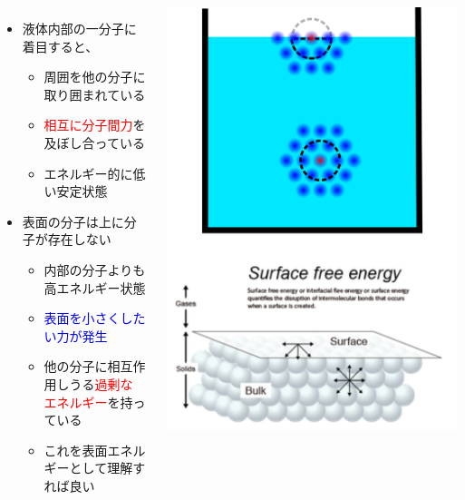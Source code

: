 \documentclass[unicode,12pt]{beamer}%
\begin{document}
\begin{frame}
	\begin{columns}[c, onlytextwidth]
			\begin{itemize}
				\item 液体内部の一分子に着目すると、
				\begin{itemize}
					\item 周囲を他の分子に取り囲まれている
					\item \textcolor{red}{相互に分子間力}を及ぼし合っている
					\item エネルギー的に低い安定状態
				\end{itemize}
				\item 表面の分子は上に分子が存在しない
				\begin{itemize}
					\item 内部の分子よりも高エネルギー状態
					\item \textcolor{blue}{表面を小さくしたい力が発生}
					\item 他の分子に相互作用しうる\textcolor{red}{過剰な\\エネルギー}を持っている
					\item これを表面エネルギーとして理解すれば良い
				\end{itemize}
			\end{itemize}
		\centering
		\includegraphics[width=\textwidth]{surface.png}
	\end{columns}
\end{frame}
\end{document}
